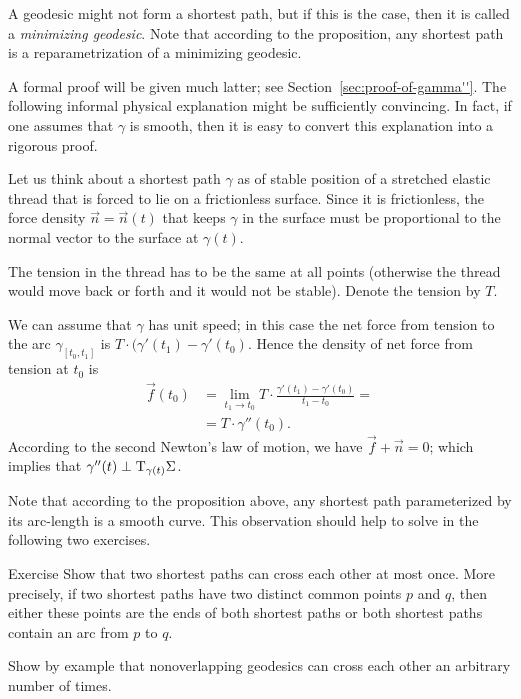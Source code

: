 A geodesic might not form a shortest path, but if this is the case, then it is called a \emph{minimizing geodesic}.
Note that according to the proposition, any shortest path is a reparametrization of a minimizing geodesic.

A formal proof will be given much latter; see Section~\ref{sec:proof-of-gamma''}. 
The following informal physical explanation might be sufficiently convincing.
In fact, if one assumes that $\gamma$ is smooth, then it is easy to convert this explanation into a rigorous proof.

Let us think about a shortest path $\gamma$ as of stable position of a stretched elastic thread that is forced to lie on a frictionless surface.
Since it is frictionless, the force density $\vec n=\vec n(t)$ that keeps $\gamma$ in the surface must be proportional to the normal vector to the surface at $\gamma(t)$.

The tension in the thread has to be the same at all points (otherwise the thread would move back or forth and it would not be stable).
Denote  the tension by $T$.

We can assume that $\gamma$ has unit speed;
in this case the net force from tension to the arc $\gamma_{[t_0,t_1]}$ is $T\cdot(\gamma'(t_1)-\gamma'(t_0)$.
Hence the density of net force from tension at $t_0$ is 
\begin{align*}
\vec f(t_0)&=\lim_{t_1\to t_0}T\cdot\frac{\gamma'(t_1)-\gamma'(t_0)}{t_1-t_0}=
\\
&=T\cdot\gamma''(t_0).
\end{align*}
According to the second Newton's law of motion, we have 
$\vec f+\vec n=0$;
which implies that  $\gamma''(t)\perp\mathrm{T}_{\gamma(t)}\Sigma$.
\qeds

Note that according to the proposition above, any shortest path parameterized by its arc-length is a smooth curve.
This observation should help to solve in the following two exercises.

\begin{thm}{Exercise}\label{ex:two-min-geod}
Show that two shortest paths can cross each other at most once.
More precisely, if two shortest paths have two distinct common points $p$ and $q$, then either these points are the ends of both shortest paths or both shortest paths contain an arc from $p$ to $q$.

Show by example that nonoverlapping geodesics can cross each other an arbitrary number of times.
\end{thm}

